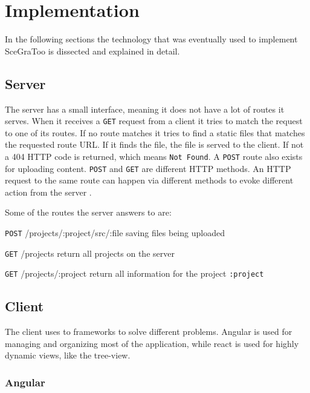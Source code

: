 
\section{Implementation}
\label{implementation}

In the following sections the technology that was eventually used to implement \gls{SceGraToo} is dissected and explained in detail.

\subsection{Server}

The server has a small interface, meaning it does not have a lot of routes it serves.
When it receives a \texttt{GET} request from a client it tries to match the request to one of its routes.
If no route matches it tries to find a static files that matches the requested route URL.
If it finds the file, the file is served to the client.
If not a 404 HTTP code is returned, which means \texttt{Not Found}.
A \texttt{POST} route also exists for uploading content.
\texttt{POST} and \texttt{GET} are different HTTP methods.
An HTTP request to the same route can happen via different methods to evoke different action from the server \cite{httpmethods}.

Some of the routes the server answers to are:

\begin{description*}
  \item[\texttt{POST} /projects/:project/src/:file]
    saving files being uploaded
  \item[\texttt{GET} /projects]
    return all projects on the server
  \item[\texttt{GET} /projects/:project]
    return all information for the project \texttt{:project}
\end{description*}

\subsection{Client}

The client uses to frameworks to solve different problems.
Angular is used for managing and organizing most of the application, while react is used for highly dynamic views, like the tree-view.

\subsubsection{Angular}
\label{angular}

